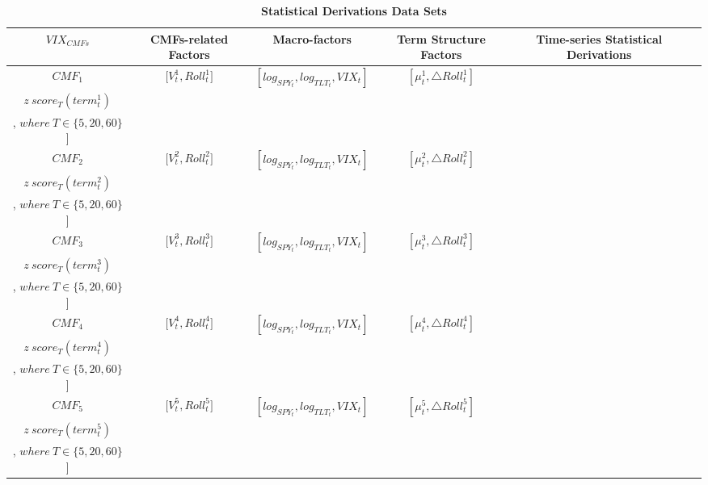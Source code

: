 \documentclass[10pt,letterpaper]{article}
\begin{document}
\begin{sidewaystable}
\caption{{\bf Statistical Derivations Data Sets}}
\centering
\begin{tabular}{|c|c|c|c|c|c|}%
    \hline %
    \(VIX_{CMFs}\)  & CMFs-related Factors & Macro-factors & Term Structure Factors & Time-series Statistical Derivations\\
    \hline %
    \(CMF_{1}\)  & \({[V_{t}^1},{Roll_{t}^1]}\) & \([log_{SPY_t},log_{TLT_t},VIX_t]\) & \({[\mu_{t}^1, \triangle Roll_{t}^1]}\) &
    \makecell[c]{\([Std_{T}(All_{t}^{1}), Skew_{T}^{1}(All_{t}^{1}),Kurt_T(All_{t}^{1}),Mean_{T}(All_{t}^{1})\),\\ \(z\ score_{T}(term_{t}^{1})\)\\ , \(where \: T \in \{5,20, 60\}\)]}   \\
    \hline
    \(CMF_{2}\)  & \({[V_{t}^2},{Roll_{t}^2]}\)  & \([log_{SPY_t},log_{TLT_t},VIX_t]\) &  \({[\mu_{t}^2, \triangle Roll_{t}^2]}\) &   \makecell[c]{\([Std_{T}(All_{t}^{2}), Skew_{T}^{2}(All_{t}^{2}),Kurt_T(All_{t}^{2}),Mean_{T}(All_{t}^{2})\),\\ \(z\ score_{T}(term_{t}^{2})\)\\ , \(where \: T \in \{5,20, 60\}\)]} \\
    \hline
    \(CMF_{3}\)  & \({[V_{t}^3},{Roll_{t}^3]}\) & \([log_{SPY_t},log_{TLT_t},VIX_t]\) & \({[\mu_{t}^3, \triangle Roll_{t}^3]}\) &  \makecell[c]{\([Std_{T}(All_{t}^{3}), Skew_{T}^{3}(All_{t}^{3}),Kurt_T(All_{t}^{3}),Mean_{T}(All_{t}^{3})\),\\ \(z\ score_{T}(term_{t}^{3})\)\\ , \(where \: T \in \{5,20, 60\}\)]}  \\
    \hline
    \(CMF_{4}\)& \({[V_{t}^4},{Roll_{t}^4]}\) & \([log_{SPY_t},log_{TLT_t},VIX_t]\) & \({[\mu_{t}^4, \triangle Roll_{t}^4]}\) &   \makecell[c]{\([Std_{T}(All_{t}^{4}), Skew_{T}^{4}(All_{t}^{4}),Kurt_T(All_{t}^{4}),Mean_{T}(All_{t}^{4})\),\\ \(z\ score_{T}(term_{t}^{4})\)\\ , \(where \: T \in \{5,20, 60\}\)]} \\
    \hline
    \(CMF_{5}\) &  \({[V_{t}^5},{Roll_{t}^5]}\) & \([log_{SPY_t},log_{TLT_t},VIX_t]\) & \({[\mu_{t}^5, \triangle Roll_{t}^5]}\) &  \makecell[c]{\([Std_{T}(All_{t}^{5}), Skew_{T}^{5}(All_{t}^{5}),Kurt_T(All_{t}^{5}),Mean_{T}(All_{t}^{5})\),\\ \(z\ score_{T}(term_{t}^{5})\)\\ , \(where \: T \in \{5,20, 60\}\)]} \\

\end{tabular}
\end{sidewaystable}
\end{document}
